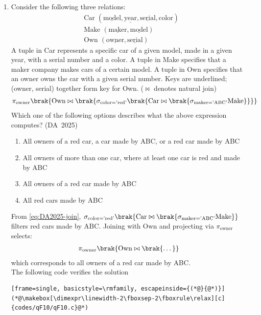 \begin{enumerate}[label=\thesubsection.\arabic*, ref=\thesubsection.\theenumi]
	\item 
	Consider the following three relations:
	\begin{align*}
		&\text{Car } (\underline{\text{model}}, \underline{\text{year}}, \underline{\text{serial}}, \text{color}) \\
		&\text{Make } (\underline{\text{maker}}, \underline{\text{model}}) \\
		&\text{Own } (\underline{\text{owner}}, \underline{\text{serial}})
	\end{align*}
	A tuple in Car represents a specific car of a given model, made in a given year, with a serial number and a color. A tuple in Make specifies that a maker company makes cars of a certain model. A tuple in Own specifies that an owner owns the car with a given serial number. Keys are underlined; (owner, serial) together form key for Own. ($\bowtie$ denotes natural join)
	\begin{align}
		\pi_{\text{owner}}\brak{\text{Own} \bowtie \brak{\sigma_{\text{color} = \text{'red'}}\brak{\text{Car} \bowtie \brak{\sigma_{\text{maker} = \text{'ABC'}}\text{Make}}}}}
	\end{align}
	Which one of the following options describes what the above expression computes?
	\hfill (DA~2025)
	\begin{enumerate}
		\item All owners of a red car, a car made by ABC, or a red car made by ABC
		\item All owners of more than one car, where at least one car is red and made by ABC
		\item All owners of a red car made by ABC
		\item All red cars made by ABC
	\end{enumerate}
	\solution
	From \eqref{eq:DA2025-join}, $\sigma_{\text{color} = \text{'red'}}\brak{\text{Car} \bowtie \brak{\sigma_{\text{maker} = \text{'ABC'}}\text{Make}}}$ filters red cars made by ABC. Joining with $\text{Own}$ and projecting via $\pi_{\text{owner}}$ selects:
	\begin{align}
		\pi_{\text{owner}}\brak{\text{Own} \bowtie \brak{\dots}}
	\end{align}
	which corresponds to all owners of a red car made by ABC.
	\\
	The following code verifies the solution
	\begin{lstlisting}[frame=single, basicstyle=\rmfamily, escapeinside={(*@}{@*)}]
(*@\makebox[\dimexpr\linewidth-2\fboxsep-2\fboxrule\relax][c]{codes/qF10/qF10.c}@*)
	\end{lstlisting}

\end{enumerate}
